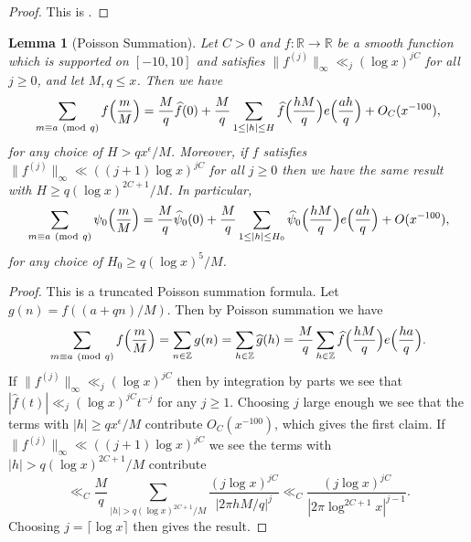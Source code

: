 \documentclass[10pt]{amsart}
\theoremstyle{plain}
\newtheorem{lmm}[thrm]{Lemma}
\numberwithin{equation}{section}
\newcommand{\Mod}[1]{\ (\mathrm{mod}\ #1)}
\renewcommand{\hat}[1]{\widehat #1}
\begin{document}
%
%
%
\begin{proof}
This is \cite[Corollary 11.12]{IwaniecKowalski}.
\end{proof}
%
%
%
%
%
%
%
%
\begin{lmm}[Poisson Summation]\label{lmm:Completion}
Let $C>0$ and  $f:\mathbb{R}\rightarrow\mathbb{R}$ be a smooth function which is supported on $[-10,10]$ and satisfies $\|f^{(j)}\|_\infty\ll_j (\log{x})^{j C}$ for all $j\ge 0$, and let $M,q\le x$. Then we have
\[
\sum_{m\equiv a\Mod{q}} f\Bigl(\frac{m}{M}\Bigr)=\frac{M}{q}\hat{f}(0)+\frac{M}{q}\sum_{1\le |h|\le H}\hat{f}\Bigl(\frac{h M}{q}\Bigr)e\Bigl(\frac{ah}{q}\Bigr)+O_C(x^{-100}),
\]
for any choice of $H>q x^\epsilon/M$. Moreover, if $f$ satisfies $\|f^{(j)}\|_\infty\ll ((j+1)\log{x})^{jC}$ for all $j\ge 0$ then we have the same result with $H\ge q(\log{x})^{2C+1}/M$. In particular,
\[
\sum_{m\equiv a\Mod{q}} \psi_0\Bigl(\frac{m}{M}\Bigr)=\frac{M}{q}\hat{\psi_0}(0)+\frac{M}{q}\sum_{1\le |h|\le H_0}\hat{\psi_0}\Bigl(\frac{h M}{q}\Bigr)e\Bigl(\frac{ah}{q}\Bigr)+O(x^{-100}),
\]
for any choice of $H_0\ge q(\log{x})^5/M$.
\end{lmm}
%
%
%
%
\begin{proof}
This is a truncated Poisson summation formula. Let $g(n)=f((a+q n)/M)$. Then by Poisson summation we have
\[
\sum_{m\equiv a\Mod{q}}f\Bigl(\frac{m}{M}\Bigr)=\sum_{n\in\mathbb{Z}}g(n)=\sum_{h\in\mathbb{Z}}\hat{g}(h)=\frac{M}{q}\sum_{h\in\mathbb{Z}}\hat{f}\Bigl(\frac{hM}{q}\Bigr)e\Bigl(\frac{ha}{q}\Bigr).
\]
If $\|f^{(j)}\|_\infty\ll_j (\log{x})^{j C}$ then by integration by parts we see that $|\hat{f}(t)|\ll_j (\log{x})^{j C} t^{-j}$ for any $j\ge 1$. Choosing $j$ large enough we see that the terms with $|h|\ge qx^\epsilon/M$ contribute $O_C(x^{-100})$, which gives the first claim. If  $\|f^{(j)}\|_\infty \ll ((j+1)\log{x})^{jC}$ we see the terms with $|h|>q(\log{x})^{2C+1}/M$ contribute
\[
\ll_C \frac{M}{q}\sum_{|h|>q(\log{x})^{2C+1}/M}\frac{(j\log{x})^{jC}}{|2\pi h M/q|^j}\ll_C\frac{(j\log{x})^{jC}}{|2\pi \log^{2C+1}{x}|^{j-1}}.
\]
Choosing $j=\lceil\log{x}\rceil$ then gives the result.
\end{proof}
%
%
%
%
%
%
%
%
\end{document}
